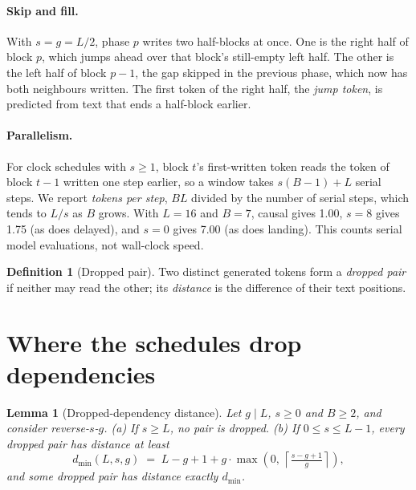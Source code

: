 \documentclass[11pt]{article}
\newtheorem{lemma}{Lemma}
\theoremstyle{definition}
\newtheorem{definition}{Definition}
\theoremstyle{remark}
\newcommand{\sch}[1]{\textsf{#1}}
\newcommand{\dmin}{d_{\min}}
\newcommand{\pos}[1]{\max\!\left(0,\,#1\right)}
\begin{document}
\paragraph{Skip and fill.}
With $s=g=L/2$, phase $p$ writes two half-blocks at once.
One is the right half of block $p$, which jumps ahead over that block's still-empty left half.
The other is the left half of block $p-1$, the gap skipped in the previous phase, which now has both neighbours written.
The first token of the right half, the \emph{jump token}, is predicted from text that ends a half-block earlier.

\paragraph{Parallelism.}
For clock schedules with $s\ge1$, block $t$'s first-written token reads the token of block $t-1$ written one step earlier, so a window takes $s(B-1)+L$ serial steps.
We report \emph{tokens per step}, $BL$ divided by the number of serial steps, which tends to $L/s$ as $B$ grows.
With $L=16$ and $B=7$, \sch{causal} gives 1.00, $s=8$ gives 1.75 (as does \sch{delayed}), and $s=0$ gives 7.00 (as does \sch{landing}).
This counts serial model evaluations, not wall-clock speed.

\begin{definition}[Dropped pair]
Two distinct generated tokens form a \emph{dropped pair} if neither may read the other; its \emph{distance} is the difference of their text positions.
\end{definition}

\section{Where the schedules drop dependencies}
\label{sec:lemma}

\begin{lemma}[Dropped-dependency distance]
\label{lem:distance}
Let $g\mid L$, $s\ge 0$ and $B\ge2$, and consider \sch{reverse-$s$-$g$}.
(a) If $s\ge L$, no pair is dropped.
(b) If $0\le s\le L-1$, every dropped pair has distance at least
\begin{equation}
  \dmin(L,s,g) \;=\; L-g+1+g\cdot\pos{\left\lceil \tfrac{s-g+1}{g}\right\rceil},
  \label{eq:dmin}
\end{equation}
and some dropped pair has distance exactly $\dmin$.
\end{lemma}
\end{document}
